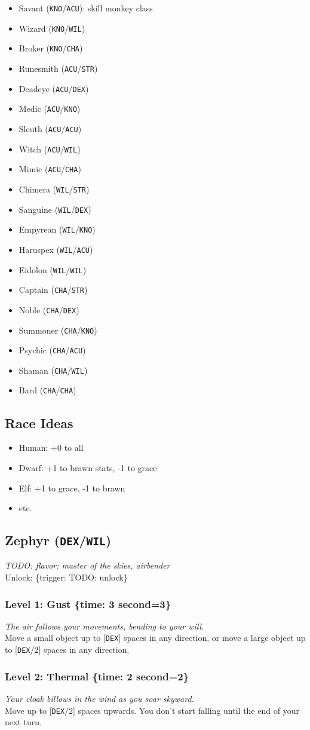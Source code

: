 \documentclass[12pt]{article}
\newcommand{\STR}{\texttt{STR}}
\newcommand{\DEX}{\texttt{DEX}}
\newcommand{\KNO}{\texttt{KNO}}
\newcommand{\ACU}{\texttt{ACU}}
\newcommand{\WIL}{\texttt{WIL}}
\newcommand{\CHA}{\texttt{CHA}}
\newcommand{\TIME}[1]{\{time: #1 second\if1=#1{}\else{s}\fi\}}
\newcommand{\TRIG}[1]{\{trigger: #1\}}
\newcommand{\Class}[4]{\pagebreak\subsection{#1 (#2)}\label{#1}\textit{#3}\\[1mm]Unlock: \TRIG{#4}}
\newcommand{\Skill}[5]{\subsubsection{Level #1: #2 #3}\textit{#4}\\[1mm]#5}
\begin{document}
\begin{itemize}
\item Savant (\KNO/\ACU): skill monkey class
\item Wizard (\KNO/\WIL)
\item Broker (\KNO/\CHA)
\item Runesmith (\ACU/\STR)
\item Deadeye (\ACU/\DEX)
\item Medic (\ACU/\KNO)
\item Sleuth (\ACU/\ACU)
\item Witch (\ACU/\WIL)
\item Mimic (\ACU/\CHA)
\item Chimera (\WIL/\STR)
\item Sanguine (\WIL/\DEX)
\item Empyrean (\WIL/\KNO)
\item Haruspex (\WIL/\ACU)
\item Eidolon (\WIL/\WIL)
\item Captain (\CHA/\STR)
\item Noble (\CHA/\DEX)
\item Summoner (\CHA/\KNO)
\item Psychic (\CHA/\ACU)
\item Shaman (\CHA/\WIL)
\item Bard (\CHA/\CHA)
\end{itemize}

\subsection{Race Ideas}
\begin{itemize}
\item Human: +0 to all
\item Dwarf: +1 to brawn stats, -1 to grace
\item Elf: +1 to grace, -1 to brawn
\item etc.
\end{itemize}

%

\Class{Zephyr}{\DEX/\WIL}
{TODO: flavor: master of the skies, airbender}
{TODO: unlock}

\Skill{1}{Gust}{\TIME{3}}
{The air follows your movements, bending to your will.}
{Move a small object up to [\DEX] spaces in any direction, or move a large object up to [\DEX/2] spaces in any direction.}

\Skill{2}{Thermal}{\TIME{2}}
{Your cloak billows in the wind as you soar skyward.}
{Move up to [\DEX/2] spaces upwards. You don't start falling until the end of your next turn.}
\end{document}
